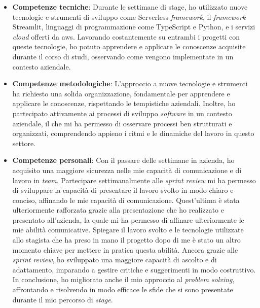 \begin{itemize}
    \item \textbf{Competenze tecniche}: Durante le settimane di stage, ho utilizzato nuove tecnologie e strumenti di sviluppo come Serverless \textit{framework}, il \textit{framework} Streamlit, linguaggi di programmazione come TypeScript e Python, e i servizi \textit{cloud} offerti da \gls{aws}. Lavorando costantemente su entrambi i progetti con queste tecnologie, ho potuto apprendere e applicare le conoscenze acquisite durante il corso di studi, osservando come vengono implementate in un contesto aziendale.
    \item \textbf{Competenze metodologiche}: L'approccio a nuove tecnologie e strumenti ha richiesto una solida organizzazione, fondamentale per apprendere e applicare le conoscenze, rispettando le tempistiche aziendali. Inoltre, ho partecipato attivamente ai processi di sviluppo \textit{software} in un contesto aziendale, il che mi ha permesso di osservare processi ben strutturati e organizzati, comprendendo appieno i ritmi e le dinamiche del lavoro in questo settore.
    \item \textbf{Competenze personali}: Con il passare delle settimane in azienda, ho acquisito una maggiore sicurezza nelle mie capacità di comunicazione e di lavoro in \textit{team}. Partecipare settimanalmente alle \textit{sprint review} mi ha permesso di sviluppare la capacità di presentare il lavoro svolto in modo chiaro e conciso, affinando le mie capacità di comunicazione. Quest’ultima è stata ulteriormente rafforzata grazie alla presentazione che ho realizzato e presentato all’azienda, la quale mi ha permesso di affinare ulteriormente le mie abilità comunicative. Spiegare il lavoro svolto e le tecnologie utilizzate allo stagista che ha preso in mano il progetto dopo di me è stato un altro momento chiave per mettere in pratica questa abilità. Ancora grazie alle \textit{sprint review}, ho sviluppato una maggiore capacità di ascolto e di adattamento, imparando a gestire critiche e suggerimenti in modo costruttivo. In conclusione, ho migliorato anche il mio approccio al \textit{problem solving}, affrontando e risolvendo in modo efficace le sfide che si sono presentate durante il mio percorso di \textit{stage}.
\end{itemize}

